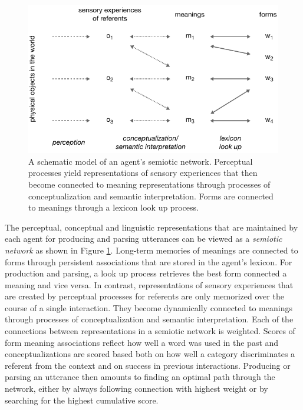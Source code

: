 \begin{figure}[t]
  \centerline{\includegraphics{figures/semiotic-network-example}}
  \caption{A schematic model of an agent's semiotic
    network. Perceptual processes yield representations of sensory
    experiences that then become connected to meaning representations
    through processes of conceptualization and semantic
    interpretation. Forms are connected to meanings through a lexicon
    look up process.}
  \label{f:semiotic-network-example}
\end{figure}


The perceptual, conceptual and linguistic representations that are
maintained by each agent for producing and parsing utterances can be
viewed as a \emph{semiotic network} as shown in Figure
\ref{f:semiotic-network-example}. Long-term memories of meanings are
connected to forms through persistent associations that are stored in
the agent's lexicon. For production and parsing, a look up process
retrieves the best form connected a meaning and vice versa. In
contrast, representations of sensory experiences that are created by
perceptual processes for referents are only memorized over the course
of a single interaction. They become dynamically connected to meanings
through processes of conceptualization and semantic
interpretation. Each of the connections between representations in a
semiotic network is weighted. Scores of form meaning associations
reflect how well a word was used in the past and conceptualizations
are scored based both on how well a category discriminates a referent
from the context and on success in previous interactions. Producing or
parsing an utterance then amounts to finding an optimal path through
the network, either by always following connection with highest weight
or by searching for the highest cumulative score.


